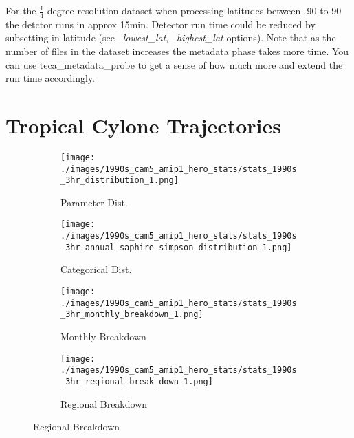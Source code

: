 \documentclass[a4paper,10pt,DIV=12]{scrreprt}
\begin{document}
For the $\frac{1}{4}$ degree resolution dataset when processing latitudes between -90 to 90 the detctor runs in approx 15min. Detector run time could be reduced by subsetting in latitude (see \textit{--lowest\_lat}, \textit{--highest\_lat} options). Note that as the number of files in the dataset increases the metadata phase takes more time. You can use teca\_metadata\_probe to get a sense of how much more and extend the run time accordingly.

\section{Tropical Cylone Trajectories}
\begin{figure}
    \centering
    \begin{subfigure}[b]{0.20\textwidth}
      \centering
      \texttt{[image: ./images/1990s\_cam5\_amip1\_hero\_stats/stats\_1990s\_3hr\_distribution\_1.png]}
      \caption{Parameter Dist.}
      \label{fig:dist}
    \end{subfigure}
    \begin{subfigure}[b]{0.245\textwidth}
      \centering
      \texttt{[image: ./images/1990s\_cam5\_amip1\_hero\_stats/stats\_1990s\_3hr\_annual\_saphire\_simpson\_distribution\_1.png]}
      \caption{Categorical Dist.}
      \label{fig:ass}
    \end{subfigure}
    \begin{subfigure}[b]{0.245\textwidth}
      \centering
      \texttt{[image: ./images/1990s\_cam5\_amip1\_hero\_stats/stats\_1990s\_3hr\_monthly\_breakdown\_1.png]}
      \caption{Monthly Breakdown}
      \label{fig:mon}
    \end{subfigure}
    \begin{subfigure}[b]{0.245\textwidth}
      \centering
      \texttt{[image: ./images/1990s\_cam5\_amip1\_hero\_stats/stats\_1990s\_3hr\_regional\_break\_down\_1.png]}
      \caption{Regional Breakdown}
      \label{fig:reg}
     \end{subfigure}
    \vspace{0.08in}

\end{figure}
\end{document}
